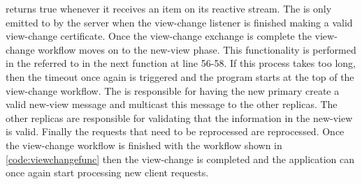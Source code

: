 returns true whenever it receives an item on its reactive stream. The  is only emitted to by the server when the view-change listener is finished making a valid view-change certificate. Once the view-change exchange is complete the view-change workflow moves on to the new-view phase. This functionality is performed in the  referred to in the next  function at line 56-58. If this process takes too long, then the timeout once again is triggered and the program starts at the top of the view-change workflow. The   is responsible for having the new primary create a valid new-view message and multicast this message to the other replicas. The other replicas are responsible for validating that the information in the new-view is valid. Finally the requests that need to be reprocessed are reprocessed. Once the view-change workflow is finished with the workflow shown in \autoref{code:viewchangefunc} then the view-change is completed and the application can once again start processing new client requests.
\fi

